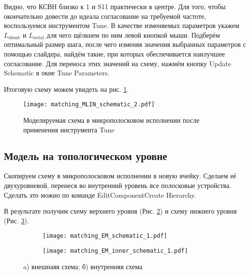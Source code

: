 Видно, что КСВН близко к 1 и S11 практически в центре.
Для того, чтобы окончательно довести до идеала согласование на требуемой частоте, воспользуемся инструментом Tune.
В качестве изменяемых параметров укажем $L_\text{shunt}$ и $L_\text{serial}$ для чего щёлкнем по ним левой кнопкой мыши.
Подберём оптимальный размер шага, после чего изменяя значения выбранных параметров с помощью слайдера, найдём такие, при которых обеспечивается наилучшее согласование.
Для переноса этих значений на схему, нажмём кнопку Update Schematic в окне Tune Parameters.

Итоговую схему можем увидеть на рис. \ref{fig:matching_MLIN_schematic_2}.

\begin{figure}
    \centering
    \texttt{[image: matching\_MLIN\_schematic\_2.pdf]}
    \caption{Моделируемая схема в микрополосковом исполнении после применения инструмента Tune}
    \label{fig:matching_MLIN_schematic_2}
\end{figure}

\subsection{Модель на топологическом уровне}

Скопируем схему в микрополосковом исполнении в новую ячейку. Сделаем её двухуровневой, перенеся во внутренний уровень все полосковые устройства. Сделать это можно по команде Edit\textrightarrow Component\textrightarrow Create Hierarchy.

В результате получим схему верхнего уровня (Рис. \ref{fig:matching_EM_schematic}) и схему нижнего уровня (Рис. \ref{fig:matching_EM_inner_schematic}).

\begin{figure}[!ht]
    \begin{subfigure}[b]{0.6\textwidth}
        \centering
        \texttt{[image: matching\_EM\_schematic\_1.pdf]}
        \caption{}
        \label{fig:matching_EM_schematic}
    \end{subfigure}
    \hfill
    \begin{subfigure}[b]{0.3\textwidth}
        \centering
        \texttt{[image: matching\_EM\_inner\_schematic\_1.pdf]}
        \caption{}
        \label{fig:matching_EM_inner_schematic}
    \end{subfigure}
    \caption{
        a) внешнаяя схема;
        б) внутренняя схема
    }
    \label{fig:matching_EM_schematics}
\end{figure}

